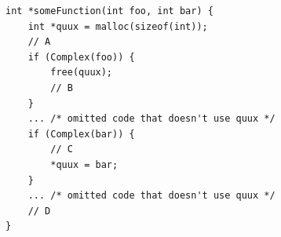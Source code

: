 \documentclass[tikz]{standalone}
\begin{document}
\begin{lrbox}{\uafCheckCode}
\begin{lstlisting}
int *someFunction(int foo, int bar) {
    int *quux = malloc(sizeof(int));
    // A
    if (Complex(foo)) {
        free(quux);
        // B
    }
    ... /* omitted code that doesn't use quux */
    if (Complex(bar)) {
        // C
        *quux = bar;
    }
    ... /* omitted code that doesn't use quux */
    // D
}
\end{lstlisting}
\end{lrbox}





\end{document}
